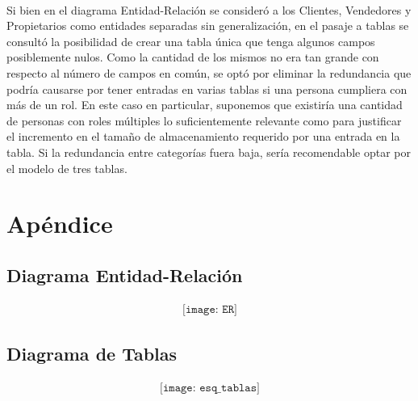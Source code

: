 \documentclass{article}
\begin{document}
\paragraph{}
Si bien en el diagrama Entidad-Relaci\'on se consider\'o a los Clientes, Vendedores y Propietarios como entidades separadas sin generalizaci\'on, en el pasaje a tablas se consult\'o la posibilidad de crear una tabla \'unica que tenga algunos campos posiblemente nulos. Como la cantidad de los mismos no era tan grande con respecto al n\'umero de campos en com\'un, se opt\'o por eliminar la redundancia que podr\'ia causarse por tener entradas en varias tablas si una persona cumpliera con m\'as de un rol.
En este caso en particular, suponemos que existir\'ia una cantidad de personas con roles m\'ultiples lo suficientemente relevante como para justificar el incremento en el tamaño de almacenamiento requerido por una entrada en la tabla. Si la redundancia entre categor\'ias fuera baja, ser\'ia recomendable optar por el modelo de tres tablas.

\section*{Ap\'endice}
\subsection{Diagrama Entidad-Relaci\'on}
\begin{align*}
\texttt{[image: ER]}
\end{align*}

\subsection{Diagrama de Tablas}
\begin{align*}
\texttt{[image: esq\_tablas]}
\end{align*}


\nocite{*}


\end{document}

